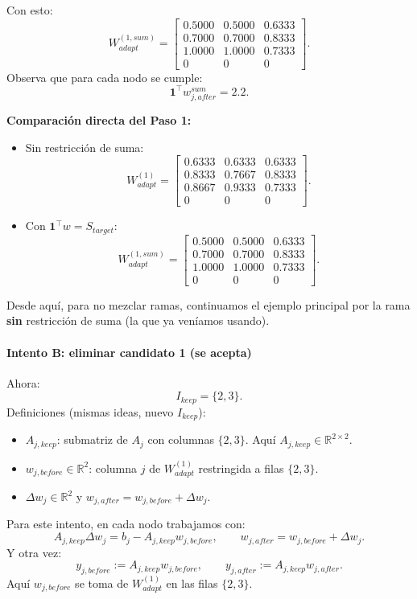 \documentclass[11pt,a4paper]{article}
\begin{document}
Con esto:
\[
W_{adapt}^{(1,sum)}=
\begin{bmatrix}
0.5000&0.5000&0.6333\\
0.7000&0.7000&0.8333\\
1.0000&1.0000&0.7333\\
0&0&0
\end{bmatrix}.
\]
Observa que para cada nodo se cumple:
\[
\mathbf 1^\top w_{j,after}^{sum}=2.2.
\]

\textbf{Comparación directa del Paso 1:}
\begin{itemize}[leftmargin=1.5em]
\item Sin restricción de suma:
\[
W_{adapt}^{(1)}=
\begin{bmatrix}
0.6333&0.6333&0.6333\\
0.8333&0.7667&0.8333\\
0.8667&0.9333&0.7333\\
0&0&0
\end{bmatrix}.
\]
\item Con $\mathbf 1^\top w=S_{target}$:
\[
W_{adapt}^{(1,sum)}=
\begin{bmatrix}
0.5000&0.5000&0.6333\\
0.7000&0.7000&0.8333\\
1.0000&1.0000&0.7333\\
0&0&0
\end{bmatrix}.
\]
\end{itemize}

Desde aquí, para no mezclar ramas, continuamos el ejemplo principal por la rama
\textbf{sin} restricción de suma (la que ya veníamos usando).

\paragraph{Intento B: eliminar candidato 1 (se acepta)}
Ahora:
\[
I_{keep}=\{2,3\}.
\]
Definiciones (mismas ideas, nuevo $I_{keep}$):
\begin{itemize}[leftmargin=1.5em]
\item $A_{j,keep}$: submatriz de $A_j$ con columnas $\{2,3\}$.
Aquí $A_{j,keep}\in\mathbb{R}^{2\times 2}$.
\item $w_{j,before}\in\mathbb{R}^{2}$:
columna $j$ de $W_{adapt}^{(1)}$ restringida a filas $\{2,3\}$.
\item $\Delta w_j\in\mathbb{R}^{2}$ y
$w_{j,after}=w_{j,before}+\Delta w_j$.
\end{itemize}

Para este intento, en cada nodo trabajamos con:
\[
A_{j,keep}\Delta w_j
=
b_j-A_{j,keep}w_{j,before},
\qquad
w_{j,after}=w_{j,before}+\Delta w_j.
\]
Y otra vez:
\[
y_{j,before}:=A_{j,keep}w_{j,before},
\qquad
y_{j,after}:=A_{j,keep}w_{j,after}.
\]
Aquí $w_{j,before}$ se toma de $W_{adapt}^{(1)}$ en las filas $\{2,3\}$.
\end{document}
